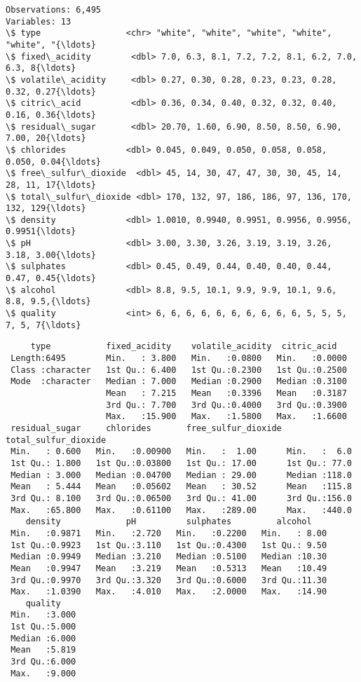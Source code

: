 \documentclass[11pt]{article}
\begin{document}
    \begin{Verbatim}[commandchars=\\\{\}]
Observations: 6,495
Variables: 13
\$ type                 <chr> "white", "white", "white", "white", "white", "{\ldots}
\$ fixed\_acidity        <dbl> 7.0, 6.3, 8.1, 7.2, 7.2, 8.1, 6.2, 7.0, 6.3, 8{\ldots}
\$ volatile\_acidity     <dbl> 0.27, 0.30, 0.28, 0.23, 0.23, 0.28, 0.32, 0.27{\ldots}
\$ citric\_acid          <dbl> 0.36, 0.34, 0.40, 0.32, 0.32, 0.40, 0.16, 0.36{\ldots}
\$ residual\_sugar       <dbl> 20.70, 1.60, 6.90, 8.50, 8.50, 6.90, 7.00, 20{\ldots}
\$ chlorides            <dbl> 0.045, 0.049, 0.050, 0.058, 0.058, 0.050, 0.04{\ldots}
\$ free\_sulfur\_dioxide  <dbl> 45, 14, 30, 47, 47, 30, 30, 45, 14, 28, 11, 17{\ldots}
\$ total\_sulfur\_dioxide <dbl> 170, 132, 97, 186, 186, 97, 136, 170, 132, 129{\ldots}
\$ density              <dbl> 1.0010, 0.9940, 0.9951, 0.9956, 0.9956, 0.9951{\ldots}
\$ pH                   <dbl> 3.00, 3.30, 3.26, 3.19, 3.19, 3.26, 3.18, 3.00{\ldots}
\$ sulphates            <dbl> 0.45, 0.49, 0.44, 0.40, 0.40, 0.44, 0.47, 0.45{\ldots}
\$ alcohol              <dbl> 8.8, 9.5, 10.1, 9.9, 9.9, 10.1, 9.6, 8.8, 9.5,{\ldots}
\$ quality              <int> 6, 6, 6, 6, 6, 6, 6, 6, 6, 6, 5, 5, 5, 7, 5, 7{\ldots}

    \end{Verbatim}

    
    \begin{verbatim}
     type           fixed_acidity    volatile_acidity  citric_acid    
 Length:6495        Min.   : 3.800   Min.   :0.0800   Min.   :0.0000  
 Class :character   1st Qu.: 6.400   1st Qu.:0.2300   1st Qu.:0.2500  
 Mode  :character   Median : 7.000   Median :0.2900   Median :0.3100  
                    Mean   : 7.215   Mean   :0.3396   Mean   :0.3187  
                    3rd Qu.: 7.700   3rd Qu.:0.4000   3rd Qu.:0.3900  
                    Max.   :15.900   Max.   :1.5800   Max.   :1.6600  
 residual_sugar     chlorides       free_sulfur_dioxide total_sulfur_dioxide
 Min.   : 0.600   Min.   :0.00900   Min.   :  1.00      Min.   :  6.0       
 1st Qu.: 1.800   1st Qu.:0.03800   1st Qu.: 17.00      1st Qu.: 77.0       
 Median : 3.000   Median :0.04700   Median : 29.00      Median :118.0       
 Mean   : 5.444   Mean   :0.05602   Mean   : 30.52      Mean   :115.8       
 3rd Qu.: 8.100   3rd Qu.:0.06500   3rd Qu.: 41.00      3rd Qu.:156.0       
 Max.   :65.800   Max.   :0.61100   Max.   :289.00      Max.   :440.0       
    density             pH          sulphates         alcohol     
 Min.   :0.9871   Min.   :2.720   Min.   :0.2200   Min.   : 8.00  
 1st Qu.:0.9923   1st Qu.:3.110   1st Qu.:0.4300   1st Qu.: 9.50  
 Median :0.9949   Median :3.210   Median :0.5100   Median :10.30  
 Mean   :0.9947   Mean   :3.219   Mean   :0.5313   Mean   :10.49  
 3rd Qu.:0.9970   3rd Qu.:3.320   3rd Qu.:0.6000   3rd Qu.:11.30  
 Max.   :1.0390   Max.   :4.010   Max.   :2.0000   Max.   :14.90  
    quality     
 Min.   :3.000  
 1st Qu.:5.000  
 Median :6.000  
 Mean   :5.819  
 3rd Qu.:6.000  
 Max.   :9.000  
    \end{verbatim}
\end{document}
